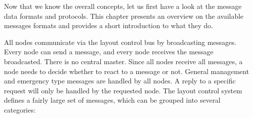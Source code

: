 
Now that we know the overall concepts, let us first have a look at the message data formats and protocols. This chapter presents an overview on the available messages formats and provides a short introduction to what they do. 

\begin{center}
\end{center}

All nodes communicate via the layout control bus by broadcasting messages. Every node can send a message, and every node receives the message broadcasted. There is no central master. Since all nodes receive all messages, a node needs to decide whether to react to a message or not. General management and emergency type messages are handled by all nodes. A reply to a specific request will only be handled by the requested node. The layout control system defines a fairly large set of messages, which can be grouped into several categories:

